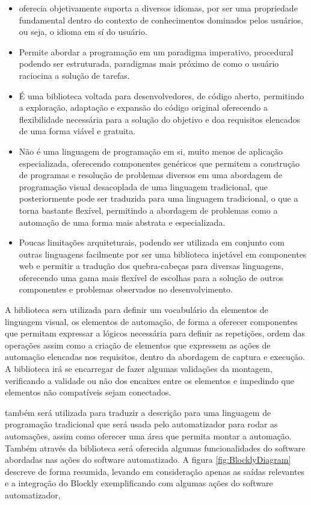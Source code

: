 \documentclass[tg]{mdtufsm}
\begin{document}
                \begin{itemize}
                    \item oferecia objetivamente suporta a diversos idiomas, por ser uma propriedade fundamental dentro do contexto de conhecimentos dominados pelos usuários, ou seja, o idioma em sí do usuário.
                    \item Permite abordar a programação em um paradigma imperativo, procedural podendo ser estruturada, paradigmas mais próximo de como o usuário raciocina a solução de tarefas.
                    \item É uma biblioteca voltada para desenvolvedores, de código aberto, permitindo a exploração, adaptação e expansão do código original oferecendo a flexibilidade necessária para a solução do objetivo e doa requisitos elencados de uma forma viável e gratuita.
                    \item Não é uma linguagem de programação em si, muito menos de aplicação especializada, oferecendo componentes genéricos que permitem a construção de programas e resolução de problemas diversos em uma abordagem de programação visual desacoplada de uma linguagem tradicional, que posteriormente pode ser traduzida para uma linguagem tradicional, o que a torna bastante flexível, permitindo a abordagem de problemas como a automação de uma forma mais abstrata e especializada.
                    \item Poucas limitações arquiteturais, podendo ser utilizada em conjunto com outras linguagens facilmente por ser uma biblioteca injetável em componentes web e permitir a tradução dos quebra-cabeças para diversas linguagens, oferecendo uma gama mais flexível de escolhas para a solução de outros componentes e problemas observados no desenvolvimento.
                \end{itemize}

                A biblioteca sera utilizada para definir um vocabulário da elementos de linguagem visual, os elementos de automação, de forma a oferecer componentes que permitam expressar a lógicos necessária para definir as repetições, ordem das operações assim como a criação de elementos que expressem as ações de automação elencadas nos requisitos, dentro da abordagem de captura e execução. A biblioteca irá se encarregar de fazer algumas validações da montagem, verificando a validade ou não dos encaixes entre os elementos e impedindo que elementos não compatíveis sejam conectados.

                também será utilizada para traduzir a descrição para uma linguagem de programação tradicional que será usada pelo automatizador para rodar as automações, assim como oferecer uma área que permita montar a automação. Também através da biblioteca será oferecida algumas funcionalidades do software abordadas nas ações do software automatizado. A figura \ref{fig:BlocklyDiagram} descreve de forma resumida, levando em consideração apenas as saídas relevantes e a integração do Blockly exemplificando com algumas ações do software automatizador,
\end{document}

